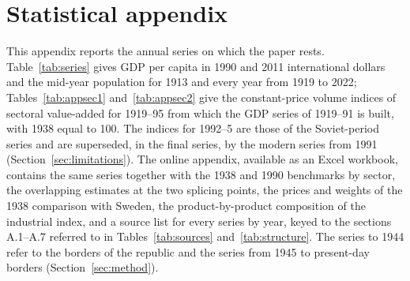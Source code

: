 \section*{Statistical appendix}
\setcounter{table}{0}
\renewcommand{\thetable}{A\arabic{table}}

This appendix reports the annual series on which the paper rests. Table~\ref{tab:series} gives GDP per capita in 1990 and 2011 international dollars and the mid-year population for 1913 and every year from 1919 to 2022; Tables~\ref{tab:appsec1} and~\ref{tab:appsec2} give the constant-price volume indices of sectoral value-added for 1919--95 from which the GDP series of 1919--91 is built, with 1938 equal to 100. The indices for 1992--5 are those of the Soviet-period series and are superseded, in the final series, by the modern series from 1991 (Section~\ref{sec:limitations}). The online appendix, available as an Excel workbook, contains the same series together with the 1938 and 1990 benchmarks by sector, the overlapping estimates at the two splicing points, the prices and weights of the 1938 comparison with Sweden, the product-by-product composition of the industrial index, and a source list for every series by year, keyed to the sections A.1--A.7 referred to in Tables~\ref{tab:sources} and~\ref{tab:structure}. The series to 1944 refer to the borders of the republic and the series from 1945 to present-day borders (Section~\ref{sec:method}).







